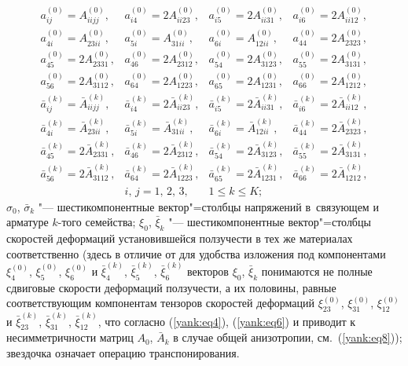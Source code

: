 \begin{equation}
\label{yank:eq8}
\begin{array}{llll}
a_{ij}^{(0)} =A_{iijj}^{(0)},   & 
a_{i4}^{(0)} = 2A_{ii23}^{(0)}, & 
a_{i5}^{(0)} = 2A_{ii31}^{(0)}, & 
a_{i6}^{(0)} = 2A_{ii12}^{(0)}, 
\\
a_{4i}^{(0)} = A_{23ii}^{(0)},  &
a_{5i}^{(0)} {=}A_{31ii}^{(0)}, &
a_{6i}^{(0)} =A_{12ii}^{(0)},   &
a_{44}^{(0)} =2A_{2323}^{(0)},  
\\
a_{45}^{(0)} =2A_{2331}^{(0)},  & 
a_{46}^{(0)}=2A_{2312}^{(0)},   &
a_{54}^{(0)} =2A_{3123}^{(0)}, &
a_{55}^{(0)} =2A_{3131}^{(0)}, 
\\
a_{56}^{(0)} =2A_{3112}^{(0)}, &
a_{64}^{(0)} =2A_{1223}^{(0)}, &
a_{65}^{(0)}=2A_{1231}^{(0)}, &
a_{66}^{(0)} =2A_{1212}^{(0)}, 
\\
\bar {a}_{ij}^{(k)} =\bar {A}_{iijj}^{(k)},  &
\bar {a}_{i4}^{(k)} =2\bar {A}_{ii23}^{(k)}, &
\bar {a}_{i5}^{(k)} =2\bar {A}_{ii31}^{(k)}, &
\bar {a}_{i6}^{(k)} =2\bar {A}_{ii12}^{(k)},
\\
\bar {a}_{4i}^{(k)} =\bar {A}_{23ii}^{(k)}, &
\bar {a}_{5i}^{(k)} =\bar {A}_{31ii}^{(k)}, &
\bar {a}_{6i}^{(k)} =\bar {A}_{12ii}^{(k)}, &
\bar {a}_{44}^{(k)} =2\bar {A}_{2323}^{(k)},
\\
\bar {a}_{45}^{(k)} =2\bar {A}_{2331}^{(k)}, &
\bar {a}_{46}^{(k)} =2\bar {A}_{2312}^{(k)}, &
\bar {a}_{54}^{(k)} =2\bar {A}_{3123}^{(k)}, &
\bar {a}_{55}^{(k)} =2\bar {A}_{3131}^{(k)}, 
\\
\bar {a}_{56}^{(k)} =2\bar {A}_{3112}^{(k)}, &
\bar {a}_{64}^{(k)} =2\bar {A}_{1223}^{(k)}, &
\bar {a}_{65}^{(k)} =2\bar {A}_{1231}^{(k)}, &
\bar {a}_{66}^{(k)} =2\bar {A}_{1212}^{(k)}, 
\\
 & i,\,j=1,\,2,\,3, & 1\le k\le K;
 \end{array}
\end{equation}
$\sigma _0$, $\bar {\sigma }_k $ "--- шестикомпонентные вектор"=столбцы напряжений в~связующем и арматуре $k$-того семейства; $\xi _0$, $\bar {\xi }_k $ "---
шестикомпонентные вектор"=столбцы скоростей деформаций установившейся
ползучести в тех же материалах соответственно (здесь в отличие от \cite{yank:bib7} для
удобства изложения под компонентами $\xi _4^{(0)}$, $\xi _5^{(0)}$, $\xi_6^{(0)}$ и $\bar {\xi }_4^{(k)}$, $\bar {\xi }_5^{(k)}$, $\bar {\xi
}_6^{(k)}$ векторов $\xi _0$, $\bar {\xi }_k $ понимаются не полные
сдвиговые скорости деформаций ползучести, а их половины, равные
соответствующим компонентам тензоров скоростей деформаций $\xi _{23}^{(0)}$, $\xi _{31}^{(0)}$, $\xi _{12}^{(0)}$ и $\bar {\xi }_{23}^{(k)}$,
$\bar {\xi }_{31}^{(k)}$, $\bar {\xi }_{12}^{(k)}$, что согласно (\ref{yank:eq4}),
(\ref{yank:eq6}) и приводит к несимметричности матриц $A_0$, $\bar {A}_k $ в случае
общей анизотропии, см.~(\ref{yank:eq8})); звездочка означает операцию транспонирования.

